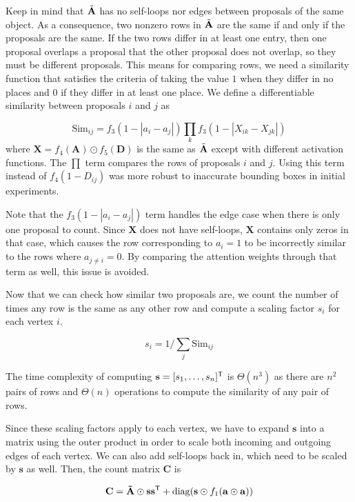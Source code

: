 \documentclass[letterpaper]{article}
\newcommand{\m}[1]{\mathbf{#1}}
\begin{document}
Keep in mind that $\AO$ has no self-loops nor edges between proposals of the same object.
As a consequence, two nonzero rows in $\AO$ are the same if and only if the proposals are the same.
If the two rows differ in at least one entry, then one proposal overlaps a proposal that the other proposal does not overlap, so they must be different proposals.
This means for comparing rows, we need a similarity function that satisfies the criteria of taking the value $1$ when they differ in no places and $0$ if they differ in at least one place.
We define a differentiable similarity between proposals $i$ and $j$ as

\begin{equation}
    \text{Sim}_{ij} =  f_3(1 - |a_i - a_j|) \prod_k f_3(1 - | X_{ik} - X_{jk} |)
\end{equation}
where $\m X = f_4(\m A) \odot f_5(\m D)$ is the same as $\AO$ except with different activation functions.
The $\prod$ term compares the rows of proposals $i$ and $j$.
Using this term instead of $f_4(1 - D_{ij})$ was more robust to inaccurate bounding boxes in initial experiments.

Note that the $f_3(1 - |a_i - a_j|)$ term handles the edge case when there is only one proposal to count.
Since $\m X$ does not have self-loops, $\m X$ contains only zeros in that case, which causes the row corresponding to $a_i = 1$ to be incorrectly similar to the rows where $a_{j \neq i} = 0$.
By comparing the attention weights through that term as well, this issue is avoided.

Now that we can check how similar two proposals are, we count the number of times any row is the same as any other row and compute a scaling factor $s_i$ for each vertex $i$.

\begin{equation}
    s_i =  1 / \sum_j \text{Sim}_{ij}
\end{equation}

The time complexity of computing $\m s = [s_1, \ldots, s_n]^\T$ is $\Theta(n^3)$ as there are $n^2$ pairs of rows and $\Theta(n)$ operations to compute the similarity of any pair of rows.

Since these scaling factors apply to each vertex, we have to expand $\m s$ into a matrix using the outer product in order to scale both incoming and outgoing edges of each vertex.
We can also add self-loops back in, which need to be scaled by $\m s$ as well.
Then, the count matrix $\m C$ is

\begin{equation}
    \m C = \m \AO \odot \m s \m s^\T + \text{diag}(\m s \odot f_1(\m a \odot \m a))
\end{equation}
\end{document}
